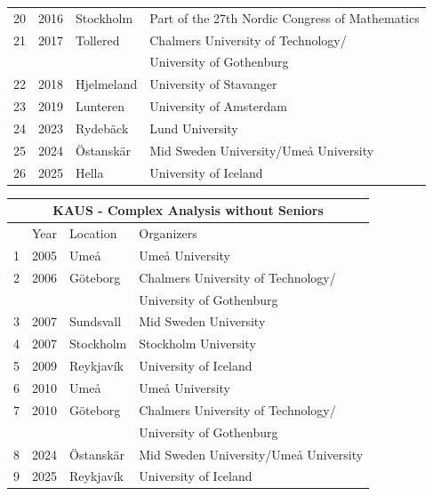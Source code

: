 \documentclass[12pt,openany]{report}      %
\begin{document}
\begin{center}
\begin{tabular}{llll}
        20 & 2016 & Stockholm & Part of the 27th Nordic Congress of Mathematics\\
        21 & 2017 & Tollered & Chalmers University of Technology/\\
           &      &               & University of Gothenburg\\
        22 & 2018 & Hjelmeland & University of Stavanger\\
        23 & 2019 & Lunteren & University of Amsterdam\\
        24 & 2023 & Rydebäck & Lund University\\
        25 & 2024 & Östanskär & Mid Sweden University/Umeå University\\
        26 & 2025 & Hella & University of Iceland\\
        \bottomrule
    \end{tabular}
\end{center}
    
\begin{center}
    \begin{tabular}{llll}
        \toprule
        \multicolumn{4}{c}{KAUS - Complex Analysis without Seniors}\\
        \midrule
         & Year & Location & Organizers \\
         \midrule
        1 & 2005 & Umeå & Umeå University\\
        2 & 2006 & Göteborg  & Chalmers University of Technology/\\
          &      &               & University of Gothenburg \\
        3 & 2007 & Sundsvall & Mid Sweden University\\
        4 & 2007 & Stockholm & Stockholm University  \\
        5 & 2009 & Reykjavík & University of Iceland\\
        6 & 2010 & Umeå & Umeå University\\
        7 & 2010 & Göteborg & Chalmers University of Technology/\\
           &      &               & University of Gothenburg\\
        8 & 2024 & Östanskär & Mid Sweden University/Umeå University\\
        9 & 2025 & Reykjavík & University of Iceland\\
        \bottomrule
    \end{tabular}
\end{center}
\end{document}
